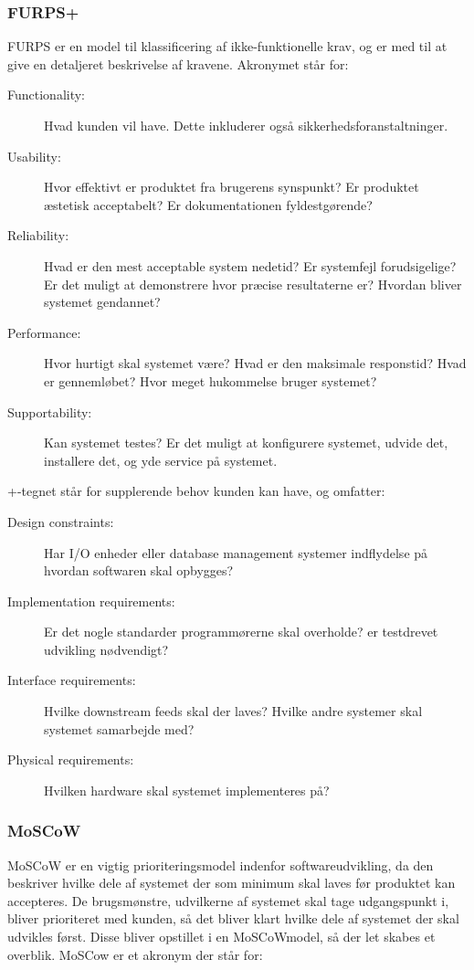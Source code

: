 \subsubsection{FURPS+}
FURPS er en model til klassificering af ikke-funktionelle krav, og er med til at give en detaljeret beskrivelse af kravene. Akronymet står for:

\begin{description}
    \item [Functionality:] Hvad kunden vil have. Dette inkluderer også sikkerhedsforanstaltninger.
    \item [Usability:] Hvor effektivt er produktet fra brugerens synspunkt? Er produktet æstetisk acceptabelt? Er dokumentationen fyldestgørende? 
    \item [Reliability:] Hvad er den mest acceptable system nedetid? Er systemfejl forudsigelige? Er det muligt at demonstrere hvor præcise resultaterne er? Hvordan bliver systemet gendannet?
    \item [Performance:] Hvor hurtigt skal systemet være? Hvad er den maksimale responstid? Hvad er gennemløbet? Hvor meget hukommelse bruger systemet?
    \item [Supportability:] Kan systemet testes? Er det muligt at konfigurere systemet, udvide det, installere det, og yde service på systemet.
\end{description}


+-tegnet står for supplerende behov kunden kan have, og omfatter:

\begin{description}
    \item [Design constraints:] Har I/O enheder eller database management systemer indflydelse på hvordan softwaren skal opbygges?
    \item [Implementation requirements:] Er det nogle standarder programmørerne skal overholde? er testdrevet udvikling nødvendigt? 
    \item [Interface requirements:] Hvilke downstream feeds skal der laves? Hvilke andre systemer skal systemet samarbejde med?
    \item [Physical requirements:] Hvilken hardware skal systemet implementeres på?
\end{description}


\subsubsection{MoSCoW}
MoSCoW er en vigtig prioriteringsmodel indenfor softwareudvikling, da den beskriver hvilke dele af systemet der som minimum skal laves før produktet kan accepteres. De brugsmønstre, udvilkerne af systemet skal tage udgangspunkt i, bliver prioriteret med kunden, så det bliver klart hvilke dele af systemet der skal udvikles først. Disse bliver opstillet i en MoSCoWmodel, så der let skabes et overblik. MoSCow er et akronym der står for:

